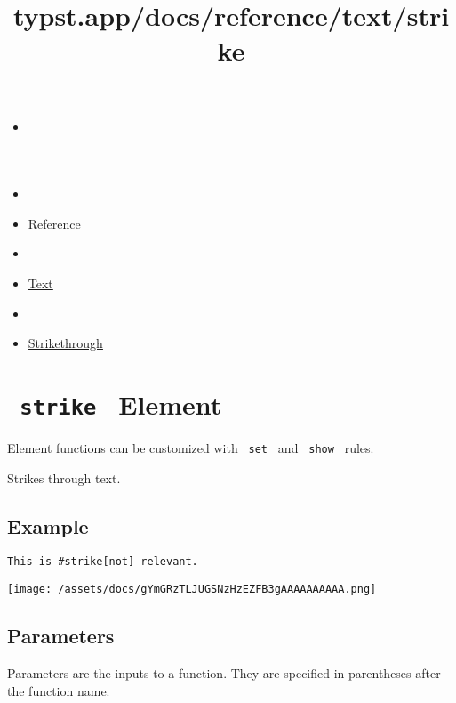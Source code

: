 \title{typst.app/docs/reference/text/strike}

\begin{itemize}
\tightlist
\item
  \href{/docs}{}
\item
  
\item
  \href{/docs/reference/}{Reference}
\item
  
\item
  \href{/docs/reference/text/}{Text}
\item
  
\item
  \href{/docs/reference/text/strike/}{Strikethrough}
\end{itemize}

\section{\texorpdfstring{\texttt{\ strike\ } {{ Element
}}}{ strike   Element }}\label{summary}

\label{element-tooltip}
Element functions can be customized with \texttt{\ set\ } and
\texttt{\ show\ } rules.

Strikes through text.

\subsection{Example}\label{example}

\begin{verbatim}
This is #strike[not] relevant.
\end{verbatim}

\texttt{[image: /assets/docs/gYmGRzTLJUGSNzHzEZFB3gAAAAAAAAAA.png]}

\subsection{\texorpdfstring{{ Parameters
}}{ Parameters }}\label{parameters}

\label{parameters-tooltip}
Parameters are the inputs to a function. They are specified in
parentheses after the function name.

